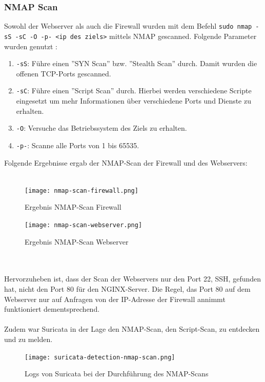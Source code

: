 \documentclass[
    a4paper,
    pagesize,
	pdftex,
    12pt,
]{scrartcl}
\begin{document}
\subsubsection{NMAP Scan}
Sowohl der Webserver als auch die Firewall wurden mit dem Befehl  \lstinline[breaklines]|sudo nmap -sS -sC -O -p- <ip des ziels>| mittels NMAP gescanned. 
Folgende Parameter wurden genutzt \cite{nmap-manual}:
\begin{enumerate}
	\item \lstinline[breaklines]|-sS|: Führe einen ''SYN Scan'' bzw. ''Stealth Scan'' durch. Damit wurden die offenen TCP-Ports gescanned. 
	\item \lstinline[breaklines]|-sC|: Führe einen ''Script Scan'' durch. Hierbei werden verschiedene Scripte eingesetzt um mehr Informationen über verschiedene Ports und Dienste zu erhalten.
	\item \lstinline[breaklines]|-O|: Versuche das Betriebssystem des Ziels zu erhalten.
	\item \lstinline[breaklines]|-p-|: Scanne alle Ports von 1 bis 65535.
\end{enumerate} 
Folgende Ergebnisse ergab der NMAP-Scan der Firewall und des Webservers: \\ \\
\begin{figure}[!ht]
	\centering
	\texttt{[image: nmap-scan-firewall.png]}
	\caption{Ergebnis NMAP-Scan Firewall}
	\label{fig:nmapfirewall}
\end{figure} 
\begin{figure}[!ht]
	\centering
	\texttt{[image: nmap-scan-webserver.png]}
	\caption{Ergebnis NMAP-Scan Webserver}
	\label{fig:nmapwebserver}
\end{figure}
\\ \\
Hervorzuheben ist, dass der Scan der Webservers nur den Port 22, SSH, gefunden hat, nicht den Port 80 für den NGINX-Server. Die Regel, das Port 80 auf dem Webserver nur auf Anfragen von der IP-Adresse der Firewall annimmt funktioniert dementsprechend.
\\ \\
Zudem war Suricata in der Lage den NMAP-Scan, den Script-Scan, zu entdecken und zu melden.
\begin{figure}[!ht]
	\centering
	\texttt{[image: suricata-detection-nmap-scan.png]}
	\caption{Logs von Suricata bei der Durchführung des NMAP-Scans}
	\label{fig:nmapsuricata}
\end{figure}
\end{document}
